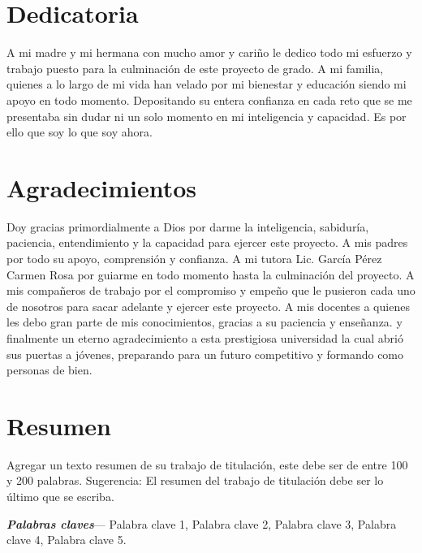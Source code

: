 
\chapter*{Dedicatoria}

A mi madre y mi hermana con mucho amor y cariño le dedico todo mi esfuerzo y trabajo puesto para la culminación de este proyecto de grado. A mi familia,  quienes a lo largo de mi vida han velado por mi bienestar y educación siendo  mi apoyo en todo momento. Depositando su entera confianza en cada reto que se me presentaba sin dudar ni un solo momento en mi inteligencia y capacidad.  Es por ello que soy lo que soy ahora.


\chapter*{Agradecimientos}

Doy  gracias primordialmente a Dios por darme  la inteligencia, sabiduría, paciencia, entendimiento y la capacidad para ejercer este proyecto. A mis padres  por todo su apoyo, comprensión y confianza. 
A mi tutora Lic. García Pérez Carmen Rosa por guiarme en todo momento hasta la culminación del proyecto.
A mis compañeros de trabajo  por el compromiso y empeño que le pusieron cada uno de nosotros para sacar adelante y ejercer este proyecto.
A mis docentes a quienes les debo gran parte de mis conocimientos, gracias a su paciencia y enseñanza. y finalmente un eterno agradecimiento a esta prestigiosa universidad la cual abrió sus puertas a jóvenes, preparando para un futuro competitivo y formando como personas de bien.




\chapter*{Resumen}


Agregar un texto resumen de su trabajo de titulación, este debe ser de entre 100 y 200 palabras. Sugerencia: El resumen del trabajo de titulación debe ser lo último que se escriba.


\vspace{1cm}
\textbf{\textit{Palabras claves}}--- 
Palabra clave 1, Palabra clave 2, Palabra clave 3, Palabra clave 4, Palabra clave 5.





























